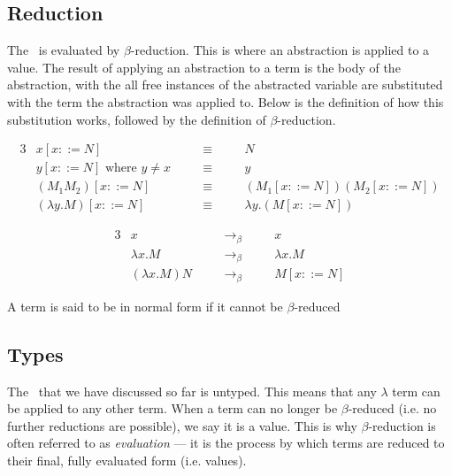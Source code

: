 \newcommand{\BetaReduce}{\rightarrow_\beta}
\subsection{Reduction}
The \lcalc\ is evaluated by $\beta$-reduction. This is where an abstraction is applied to a value. The result of applying an abstraction to a term is the body of the abstraction, with the all free instances of the abstracted variable are substituted with the term the abstraction was applied to. Below is the definition of how this substitution works, followed by the definition of $\beta$-reduction. 

\begin{definition}$\ $\vspace{-0.5cm}
\begin{alignat*}{3}
&x[x::=N]                           \quad && \equiv \quad && N\\
&y[x::=N] \text{ where } y \ne x    \quad && \equiv \quad && y\\
&(M_1 M_2)[x::=N]                   \quad && \equiv \quad && (M_1[x::=N]) (M_2[x::=N])\\
&(\lambda y.M)[x::=N]                \quad && \equiv \quad && \lambda y.(M[x::=N])
\end{alignat*}  
\end{definition}

\begin{definition}$\ $\vspace{-0.5cm}
\begin{alignat*}{3}
&x                 \quad && \BetaReduce \quad &&        x\\
&\lambda x.M       \quad && \BetaReduce \quad &&        \lambda x.M\\
&(\lambda x.M) N   \quad && \BetaReduce \quad &&        M[x::=N]
\end{alignat*}    
\end{definition}

\begin{definition}
A term is said to be in normal form if it cannot be $\beta$-reduced
\end{definition}

\subsection{Types}
The \lcalc\ that we have discussed so far is untyped. This means that any $\lambda$ term can be applied to any other term. When a term can no longer be $\beta$-reduced (i.e. no further reductions are possible), we say it is a value. This is why $\beta$-reduction is often referred to as \textit{evaluation} — it is the process by which terms are reduced to their final, fully evaluated form (i.e. values).

